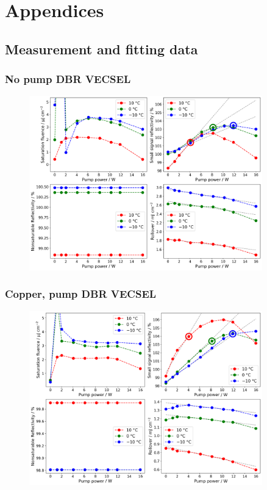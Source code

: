 \chapter{Appendices}\label{app:data}

\section{Measurement and fitting data}

\subsection{No pump DBR VECSEL}
\begin{figure}[ht]
    \centering
    \includegraphics[width=0.9\textwidth]{images/no-pump-DBR_paramfig.png}
\end{figure}
\newpage





\newpage

\subsection{Copper, pump DBR VECSEL}
\begin{figure}[ht]
    \centering
    \includegraphics[width=0.9\textwidth]{images/copper-pump-DBR_paramfig.png}
\end{figure}

